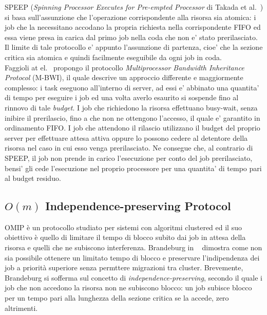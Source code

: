 SPEEP (\textit{Spinning Processor Executes for Pre-empted Processor} di Takada et al.~\cite{641276}) si basa sull'assunzione che l'operazione corrispondente alla risorsa sia atomica: i job che la necessitano accodano la propria richiesta nella corrispondente FIFO ed essa viene presa in carica dal primo job nella coda che non e' stato prerilasciato. Il limite di tale protocollo e' appunto l'assunzione di partenza, cioe' che la sezione critica sia atomica e quindi facilmente eseguibile da ogni job in coda.\\

Faggioli at el.~\cite{5562902} propongo il protocollo \textit{Multiprocessor Bandwidth Inheritance Protocol} (M-BWI), il quale descrive un approccio differente e maggiormente complesso: i task eseguono all'interno di server, ad essi e' abbinato una quantita' di tempo per eseguire i job ed una volta averlo esaurito si sospende fino al rinnovo di tale \textit{budget}. I job che richiedono la risorsa effettuano busy-wait, senza inibire il prerilascio, fino a che non ne ottengono l'accesso, il quale e' garantito in ordinamento FIFO. I job che attendono il rilascio utilizzano il budget del proprio server per effettuare attesa attiva oppure lo possono cedere al detentore della risorsa nel caso in cui esso venga prerilasciato. Ne consegue che, al contrario di SPEEP, il job non prende in carico l'esecuzione per conto del job prerilasciato, bensi' gli cede l'esecuzione nel proprio processore per una quantita' di tempo pari al budget residuo.\\

\subsection{$O(m)$ Independence-preserving Protocol}
\label{sec:lockProtocols.omip}

OMIP è un protocollo studiato per sistemi con algoritmi clustered ed il suo obiettivo è quello di limitare il tempo di blocco subito dai job in attesa della risorsa e quelli che ne subiscono interferenza.  Brandeburg in ~\cite{6602109} dimostra come non sia possibile ottenere un limitato tempo di blocco e preservare l’indipendenza dei job a priorità superiore senza permttere migrazioni tra cluster. Brevemente, Brandeburg si sofferma sul concetto di \textit{independence-preserving}, secondo il quale i job che non accedono la risorsa non ne subiscono blocco: un job subisce blocco per un tempo pari alla lunghezza della sezione critica se la accede, zero altrimenti.\\


